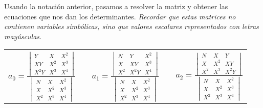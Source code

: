\documentclass[11pt,letterpaper]{article}
\begin{document}
Usando la notación anterior, pasamos a resolver la matriz y obtener las ecuaciones que nos dan los determinantes. \emph{Recordar que estas matrices no contienen variables simbólicas, sino que valores escalares representados con letras mayúsculas.}
\begin{table}[H] \centering \begin{tabular}{c c c c c}
$a_0 = \frac{
		\begin{vmatrix}
		 	Y &	X	& X^2 \\
		 	XY &	X^2	& X^3 \\
		 	X^2Y & X^3 & X^4	 
		\end{vmatrix}}
		{\begin{vmatrix}
		 	N &	X	& X^2 \\
		 	X &	X^2	& X^3 \\
		 	X^2 & X^3 & X^4	 
		\end{vmatrix}}
		
$ & &
$ a_1 = \frac{
		\begin{vmatrix}
		 	N &	Y	& X^2 \\
		 	X &	XY	& X^3 \\
		 	X^2 & X^2Y & X^4 
		\end{vmatrix}}
		{\begin{vmatrix}
		 	N &	X	& X^2 \\
		 	X &	X^2	& X^3 \\
		 	X^2 & X^3 & X^4	 
		\end{vmatrix}}
$ & &
$ a_2 = \frac{
		\begin{vmatrix}
		 	N &	X	& Y \\
		 	X &	X^2	& XY \\
		 	X^2 & X^3 & X^2Y 
		\end{vmatrix}}
		{\begin{vmatrix}
		 	N &	X	& X^2 \\
		 	X &	X^2	& X^3 \\
		 	X^2 & X^3 & X^4	 
		\end{vmatrix}}
$ \\
\end{tabular} \end{table}
\end{document}
